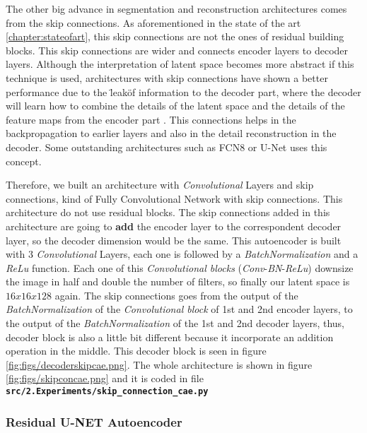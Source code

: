 The other big advance in segmentation and reconstruction architectures comes from the skip connections. As aforementioned in the state of the art \ref{chapter:stateofart}, this skip connections are not the ones of residual building blocks. This skip connections are wider and connects encoder layers to decoder layers. Although the interpretation of latent space becomes more abstract if this technique is used, architectures with skip connections have shown a better performance due to the \"leak\" of information to the decoder part, where the decoder will learn how to combine the details of the latent space and the details of the feature maps from the encoder part \cite{superresolution} \cite{2020inpainting} \cite{pinaya2019}. This connections helps in the backpropagation to earlier layers and also in the detail reconstruction in the decoder. Some outstanding architectures such as FCN8 or U-Net uses this concept.

Therefore, we built an architecture with \textit{Convolutional} Layers and skip connections, kind of Fully Convolutional Network with skip connections. This architecture do not use residual blocks. The skip connections added in this architecture are going to \textbf{add} the encoder layer to the correspondent decoder layer, so the decoder dimension would be the same. This autoencoder is built with 3 \textit{Convolutional} Layers, each one is followed by a \textit{BatchNormalization} and a \textit{ReLu} function. Each one of this \textit{Convolutional blocks} (\textit{Conv}-\textit{BN}-\textit{ReLu}) downsize the image in half and double the number of filters, so finally our latent space is $16x16x128$ again. The skip connections goes from the output of the \textit{BatchNormalization} of the \textit{Convolutional block} of 1st and 2nd encoder layers, to the output of the \textit{BatchNormalization} of the 1st and 2nd decoder layers, thus, decoder block is also a little bit different because it incorporate an addition operation in the middle. This decoder block is seen in figure \ref{fig:figs/decoderskipcae.png}. The whole architecture is shown in figure \ref{fig:figs/skipconcae.png} and it is coded in file \textbf{\texttt{src/2.Experiments\-/skip\_conne\-ction\-\_cae.py}}



\subsubsection{Residual U-NET Autoencoder}
\label{section:resunet}

